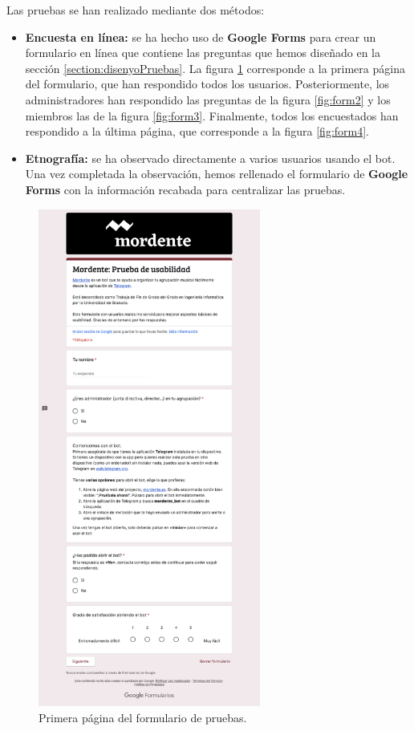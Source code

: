 Las pruebas se han realizado mediante dos métodos:

\begin{itemize}
    \item \textbf{Encuesta en línea:} se ha hecho uso de \textbf{Google Forms} para crear un formulario en línea que contiene las preguntas que hemos diseñado en la sección \ref{section:disenyoPruebas}. La figura \ref{fig:form1} corresponde a la primera página del formulario, que han respondido todos los usuarios. Posteriormente, los administradores han respondido las preguntas de la figura \ref{fig:form2} y los miembros las de la figura \ref{fig:form3}. Finalmente, todos los encuestados han respondido a la última página, que corresponde a la figura \ref{fig:form4}.
    \item \textbf{Etnografía:} se ha observado directamente a varios usuarios usando el bot. Una vez completada la observación, hemos rellenado el formulario de \textbf{Google Forms} con la información recabada para centralizar las pruebas.
\end{itemize}

\begin{figure}[h]
\centering
\includegraphics[width=0.65\textwidth]{imagenes/pruebas/form_1.png}
\caption{Primera página del formulario de pruebas.}
\label{fig:form1}
\end{figure}

